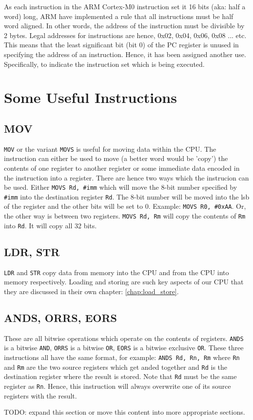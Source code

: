 As each instruction in the ARM Cortex-M0 instruction set it 16 bits (aka: half a word) long, ARM have implemented a rule that all instructions must be half word aligned. In other words, the address of the instruction must be divisible by 2 bytes. Legal addresses for instructions are hence, 0x02, 0x04, 0x06, 0x08 ... etc. 
This means that the least significant bit (bit 0) of the PC register is unused in specifying the address of an instruction. 
Hence, it has been assigned another use. Specifically, to indicate the instruction set which is being executed. 

\section{Some Useful Instructions}
\subsection{MOV}
\texttt{MOV} or the variant \texttt{MOVS} is useful for moving data within the CPU. The instruction can either be used to move (a better word would be 'copy') the contents of one register to another register or some immediate data encoded in the instruction into a register. There are hence two ways which the instrucion can be used. Either \texttt{MOVS Rd, \#imm} which will move the 8-bit number specified by \texttt{\#imm} into the destination register \texttt{Rd}. The 8-bit number will be moved into the lsb of the register and the other bits will be set to 0. Example: \texttt{MOVS R0, \#0xAA}. Or, the other way is between two registers. \texttt{MOVS Rd, Rm} will copy the contents of \texttt{Rm} into \texttt{Rd}. It will copy all 32 bits.

\subsection{LDR, STR}
\texttt{LDR} and \texttt{STR} copy data from memory into the CPU and from the CPU into memory respectively. Loading and storing are such key aspects of our CPU that they are discussed in their own chapter: \autoref{chap:load_store}.

\subsection{ANDS, ORRS, EORS}
These are all bitwise operations which operate on the contents of registers. \texttt{ANDS} is a bitwise \texttt{AND}, \texttt{ORRS} is a bitwise \texttt{OR}, \texttt{EORS} is a bitwise exclusive \texttt{OR}. These three instructions all have the same format, for example: \texttt{ANDS Rd, Rn, Rm} where \texttt{Rn} and \texttt{Rm} are the two source registers which get anded together and \texttt{Rd} is the destination register where the result is stored. Note that \texttt{Rd} must be the same register as \texttt{Rn}. Hence, this instruction will always overwrite one of its source registers with the result.

TODO: expand this section or move this content into more appropriate sections.
